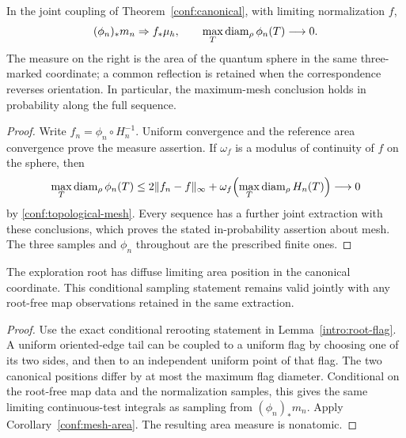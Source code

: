 \begin{corollary}
\label{conf:mesh-area}
In the joint coupling of Theorem~\ref{conf:canonical}, with
limiting normalization \(f\),
\[
 (\phi_n)_*m_n\Rightarrow f_*\mu_h,
 \qquad
 \max_T\operatorname{diam}_\rho\phi_n(T)\longrightarrow0.
\]
The measure on the right is the area of the quantum sphere in
the same three-marked coordinate; a common reflection is retained
when the correspondence reverses orientation.  In particular,
the maximum-mesh conclusion holds in probability along the full
sequence.
\end{corollary}

\begin{proof}
Write \(f_n=\phi_n\circ H_n^{-1}\).  Uniform convergence and
the reference area convergence prove the measure assertion.  If
\(\omega_f\) is a modulus of continuity of \(f\) on the sphere,
then
\[
 \max_T\operatorname{diam}_\rho\phi_n(T)
 \le2\|f_n-f\|_\infty+
       \omega_f\!\left(\max_T\operatorname{diam}_\rho H_n(T)\right)
       \longrightarrow0
\]
by \eqref{conf:topological-mesh}.  Every sequence has a further
joint extraction with these conclusions, which proves the stated
in-probability assertion about mesh.  The
three samples and \(\phi_n\) throughout are the prescribed
finite ones.
\end{proof}

\begin{corollary}
\label{conf:root-area}
The exploration root has diffuse limiting area position in the
canonical coordinate.  This conditional sampling statement remains
valid jointly with any root-free map observations retained in the
same extraction.
\end{corollary}

\begin{proof}
Use the exact conditional rerooting statement in
Lemma~\ref{intro:root-flag}.  A uniform oriented-edge tail can be
coupled to a uniform flag by choosing one of its two sides, and
then to an independent uniform point of that flag.  The two
canonical positions differ by at most the maximum flag diameter.
Conditional on the root-free map data and the normalization
samples, this gives the same limiting continuous-test integrals
as sampling from \((\phi_n)_*m_n\).  Apply
Corollary~\ref{conf:mesh-area}.  The resulting area measure is
nonatomic.
\end{proof}
